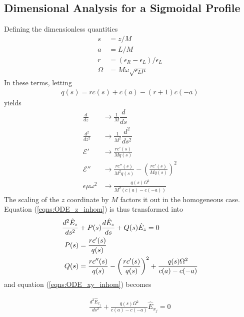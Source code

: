 \documentclass[twocolumn,secnumarabic,amssymb, nobibnotes, aps, prd]{revtex4-1}
\begin{document}
\subsection{Dimensional Analysis for a Sigmoidal Profile}
Defining the dimensionless quantities 
\begin{subequations}
\begin{align}
s &= z/M \label{eqns:def_nd_sigmoid_s} \\
a &= L/M \label{eqns:def_nd_sigmoid_a} \\
r &= (\epsilon_R - \epsilon_L)/\epsilon_L \label{eqns:def_nd_sigmoid_r} \\
\Omega &= M \omega \sqrt{\epsilon_L \mu} \label{eqns:def_nd_sigmoid_W} 
\end{align}
\end{subequations}
In these terms, letting
\begin{align}
q(s) = rc(s)+c(a)-(r+1)c(-a)
\label{eqns:eps_simp}
\end{align}
yields
\begin{align*}
\frac{d}{dz} &\rightarrow \frac{1}{M}\dfrac{d}{ds} \\
\frac{d^2}{dz^2} &\rightarrow \frac{1}{M^2}\dfrac{d^2}{ds^2} \\
\mathcal{E}' &\rightarrow \frac{r c'(s)}{M q(s)}	\\
\mathcal{E}'' &\rightarrow \frac{r c''(s)}{M^2 q(s)} - \left( \frac{r c'(s)}{M q(s)}\right)^2 \\
\epsilon \mu \omega^2 &\rightarrow \frac{q(s) \Omega ^2}{M^2 (c(a)-c(-a))}
\end{align*}
The scaling of the $z$ coordinate by $M$ factors it out in the  homogeneous case. Equation (\ref{eqns:ODE_z_inhom}) is thus transformed into 
\begin{align}
\label{eqns:ODE_Ez_DimGroup}
\frac{d^2 \hat{E}_z}{ds^2} & + P(s) \frac{d \hat{E}_z}{ds} + Q(s) \hat{E}_z = 0 \\
P(s) &= \frac{r c'(s)}{q(s)} \notag \\
Q(s) &=   \frac{r c''(s)}{q(s)} - \left( \frac{r c'(s)}{ q(s)}\right)^2 + \frac{q(s) \Omega ^2}{c(a)-c(-a)}   \notag
\end{align}
and equation (\ref{eqns:ODE_xy_inhom}) becomes

\begin{align}
\label{eqns:ODE_Ex_DimGroup}
\frac{d^2 \hat{E}_{x_j}}{ds^2} + \frac{q(s) \Omega ^2}{c(a)-c(-a)}\hat{E}_{x_j} = 0
\end{align}


\end{document}
